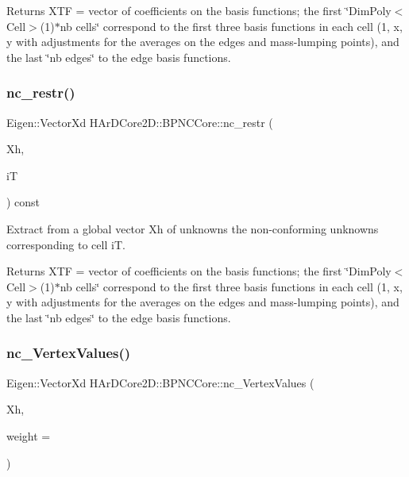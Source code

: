 \begin{DoxyReturn}{Returns}
X\+TF = vector of coefficients on the basis functions; the first \char`\"{}\+Dim\+Poly$<$\+Cell$>$(1)$\ast$nb cells\char`\"{} correspond to the first three basis functions in each cell (1, x, y with adjustments for the averages on the edges and mass-\/lumping points), and the last \char`\"{}nb edges\char`\"{} to the edge basis functions. 
\end{DoxyReturn}
\mbox{\label{group__BPNC_gad91a640f713f2f584b9280d7740f97da}} 
\subsubsection{\texorpdfstring{nc\+\_\+restr()}{nc\_restr()}}
{\footnotesize\ttfamily Eigen\+::\+Vector\+Xd H\+Ar\+D\+Core2\+D\+::\+B\+P\+N\+C\+Core\+::nc\+\_\+restr (\begin{DoxyParamCaption}\item[{const Eigen\+::\+Vector\+Xd \&}]{Xh,  }\item[{size\+\_\+t}]{iT }\end{DoxyParamCaption}) const}



Extract from a global vector Xh of unknowns the non-\/conforming unknowns corresponding to cell iT. 

\begin{DoxyReturn}{Returns}
X\+TF = vector of coefficients on the basis functions; the first \char`\"{}\+Dim\+Poly$<$\+Cell$>$(1)$\ast$nb cells\char`\"{} correspond to the first three basis functions in each cell (1, x, y with adjustments for the averages on the edges and mass-\/lumping points), and the last \char`\"{}nb edges\char`\"{} to the edge basis functions. 
\end{DoxyReturn}
\mbox{\label{group__BPNC_ga2c3a632143dcb66992710d39cfb9ed42}} 
\subsubsection{\texorpdfstring{nc\+\_\+\+Vertex\+Values()}{nc\_VertexValues()}}
{\footnotesize\ttfamily Eigen\+::\+Vector\+Xd H\+Ar\+D\+Core2\+D\+::\+B\+P\+N\+C\+Core\+::nc\+\_\+\+Vertex\+Values (\begin{DoxyParamCaption}\item[{const Eigen\+::\+Vector\+Xd}]{Xh,  }\item[{const double}]{weight = {} }\end{DoxyParamCaption})}



